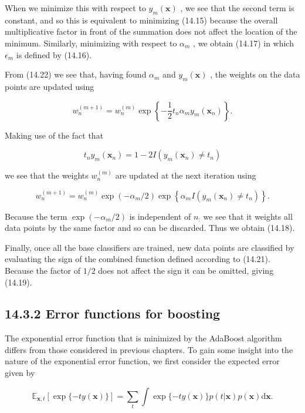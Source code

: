 \documentclass[
  10
]{article}
\begin{document}
When we minimize this with respect to \(y _ { m } ( \mathbf { x } )\) ,
we see that the second term is constant, and so this is equivalent to
minimizing (14.15) because the overall multiplicative factor in front of
the summation does not affect the location of the minimum. Similarly,
minimizing with respect to \(\alpha _ { m }\) , we obtain (14.17) in
which \(\epsilon _ { m }\) is defined by (14.16).

From (14.22) we see that, having found \(\alpha _ { m }\) and
\(y _ { m } ( \mathbf x )\) , the weights on the data points are updated
using

\[
w _ {n} ^ {(m + 1)} = w _ {n} ^ {(m)} \exp \left\{- \frac {1}{2} t _ {n} \alpha_ {m} y _ {m} (\mathbf {x} _ {n}) \right\}.\tag{14.24}
\]

Making use of the fact that

\[
t _ {n} y _ {m} (\mathbf {x} _ {n}) = 1 - 2 I (y _ {m} (\mathbf {x} _ {n}) \neq t _ {n})\tag{14.25}
\]

we see that the weights \(w _ { n } ^ { ( m ) }\) are updated at the
next iteration using

\[
w _ {n} ^ {(m + 1)} = w _ {n} ^ {(m)} \exp (- \alpha_ {m} / 2) \exp \left\{\alpha_ {m} I (y _ {m} (\mathbf {x} _ {n}) \neq t _ {n}) \right\}.\tag{14.26}
\]

Because the term \(\exp ( - \alpha _ { m } / 2 )\) is independent of
\(n _ { \colon }\) we see that it weights all data points by the same
factor and so can be discarded. Thus we obtain (14.18).

Finally, once all the base classifiers are trained, new data points are
classified by evaluating the sign of the combined function defined
according to (14.21). Because the factor of \(1 / 2\) does not affect
the sign it can be omitted, giving (14.19).

\subsection{14.3.2 Error functions for
boosting}\label{error-functions-for-boosting}

The exponential error function that is minimized by the AdaBoost
algorithm differs from those considered in previous chapters. To gain
some insight into the nature of the exponential error function, we first
consider the expected error given by

\[
\mathbb {E} _ {\mathbf {x}, t} \left[ \exp \{- t y (\mathbf {x}) \} \right] = \sum_ {t} \int \exp \{- t y (\mathbf {x}) \} p (t | \mathbf {x}) p (\mathbf {x}) \mathrm{d} \mathbf {x}.\tag{14.27}
\]
\end{document}
